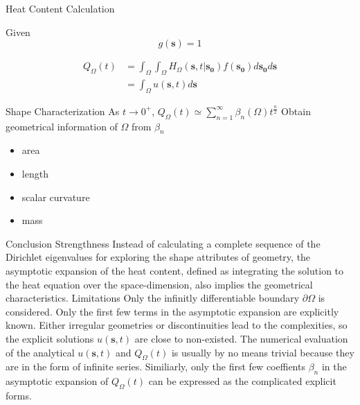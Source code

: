 \documentclass{article}
\begin{document}
\begin{outline}[enumerate]
     \3 Heat Content Calculation
       \par
       Given 
       \begin{equation} \label{eq:g}
         g(\bm{s}) = 1  
       \end{equation}

       \begin{align}
         Q_{\Omega}(t) &= \int_{\Omega} \int_{\Omega} H_{\Omega}(\bm{s}, t | \bm{s_0}) f(\bm{s_0})  d\bm{s_0} d\bm{s} \label{eq:heat_content_integral_full} \\
            &= \int_{\Omega} u(\bm{s}, t) d\bm{s} \label{eq:heat_content_integral_convol}
       \end{align}
       
          
        
     \3 Shape Characterization
        \4 As $t \rightarrow 0^{+}$, $Q_{\Omega}(t) \simeq \sum_{n=1}^{\infty} \beta_n(\Omega) t ^{\frac{n}{2}}$
        \4 Obtain geometrical information of $\Omega$ from $\beta_n$
         \begin{itemize}
           \item area
           \item length
           \item scalar curvature
           \item mass
         \end{itemize}
         

    \2 Conclusion
      \3 Strengthness
        \4 Instead of calculating a complete sequence of the Dirichlet eigenvalues for exploring the shape attributes of geometry, the asymptotic expansion of the heat content, defined as integrating the solution to the heat equation over the space-dimension, also implies the geometrical characteristics.  
      \3 Limitations
        \4 Only the infinitly differentiable boundary $\partial \Omega$ is considered.
        \4 Only the first few terms in the asymptotic expansion are explicitly known.
        \4 Either irregular geometries or discontinuities lead to the complexities, so the explicit solutions $u(\bm{s}, t)$ are close to non-existed.
        \4 The numerical evaluation of the analytical $u(\bm{s}, t)$ and $Q_{\Omega}(t)$ is usually by no means trivial because they are in the form of infinite series.
        \4 Similiarly, only the first few coeffients $\beta_n$ in the asymptotic expansion of $Q_{\Omega}(t)$ can be expressed as the complicated explicit forms.

   \newpage


\end{outline}
\end{document}
